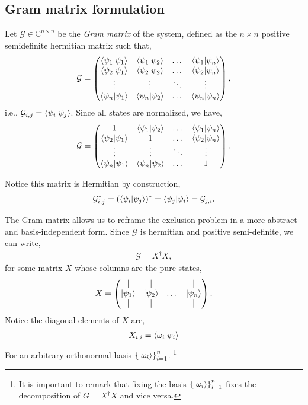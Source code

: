 \documentclass[12pt,letterpaper]{article}
\begin{document}
\begin{multicols}{2}
\subsection{Gram matrix formulation}
Let $\mathcal{G} \in \mathbb{C}^{n \times n}$ be the \emph{Gram matrix} of the system, defined as the $n\times n$ positive semidefinite hermitian matrix such that,
\begin{equation*}
	\mathcal{G} =
	\begin{pmatrix}
		\braket{\psi_1|\psi_1} & \braket{\psi_1|\psi_2} & \dots & \braket{\psi_1|\psi_n}\\
		\braket{\psi_2|\psi_1} & \braket{\psi_2|\psi_2} & \dots & \braket{\psi_2|\psi_n}\\
		\vdots & \vdots & \ddots & \vdots\\
		\braket{\psi_n|\psi_1} & \braket{\psi_n|\psi_2} & \dots & \braket{\psi_n|\psi_n}
	\end{pmatrix},
\end{equation*}
i.e., $\mathcal{G}_{i,j} = \braket{\psi_i|\psi_j}$. Since all states are normalized, we have,
\begin{equation*}
	\mathcal{G} =
	\begin{pmatrix}
		1 & \braket{\psi_1|\psi_2} & \dots & \braket{\psi_1|\psi_n}\\
		\braket{\psi_2|\psi_1} & 1 & \dots & \braket{\psi_2|\psi_n}\\
		\vdots & \vdots & \ddots & \vdots\\
		\braket{\psi_n|\psi_1} & \braket{\psi_n|\psi_2} & \dots & 1
	\end{pmatrix}.
\end{equation*}

Notice this matrix is Hermitian by construction,
\begin{align*}
\mathcal{G}_{i,j}^* = (\braket{\psi_i|\psi_j})^* = \braket{\psi_j|\psi_i} = \mathcal{G}_{j,i}.
\end{align*}

The Gram matrix allows us to reframe the exclusion problem in a more abstract and basis-independent form. Since $\mathcal{G}$ is hermitian and positive semi-definite, we can write,
\begin{align*}
\mathcal{G} = X^\dagger X,
\end{align*}
for some matrix $X$ whose columns are the pure states,
\begin{align*}
	X = \begin{pmatrix}
		\mid & \mid &        & \mid \\
		\ket{\psi_1} & \ket{\psi_2} & \dots & \ket{\psi_n} \\
		\mid & \mid &        & \mid
	\end{pmatrix}.
\end{align*}
Notice the diagonal elements of $X$ are,
\begin{align*}
	X_{i,i}=\braket{\omega_i|\psi_i}
\end{align*}
For an arbitrary orthonormal basis $\left\{\ket{\omega_i}\right\}_{i=1}^n$. \footnote{It is important to remark that fixing the basis $\left\{\ket{\omega_i}\right\}_{i=1}^n$ fixes the decomposition of $G=X^\dagger X$ and vice versa.}


\end{multicols}
\end{document}
